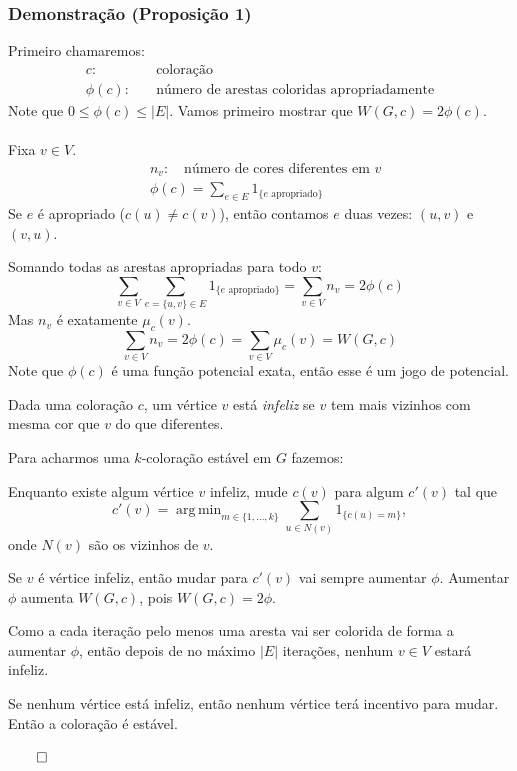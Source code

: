 \documentclass{beamer}
\DeclareMathOperator*{\argmin}{arg\,min}
\theoremstyle{plain}
\newcommand{\p}{\pause}
\begin{document}
\begin{frame}
  \frametitle{Demonstração (Proposição 1)}
  Primeiro chamaremos:
  \begin{align*}
    c:\quad &\text{coloração}\\
    \phi(c):\quad &\text{número de arestas coloridas apropriadamente}
  \end{align*}\p
  Note que $0\leq \phi(c)\leq |E|$. Vamos primeiro mostrar que $W(G,c)=2\phi(c)$.\\~\\\p
  Fixa $v\in V$.\p
  \begin{align*}
    &n_v:\quad \text{número de cores diferentes em $v$}\\
    &\phi(c)=\sum_{e\in E}1_{\{e\text{ apropriado}\}}
  \end{align*}\p
  Se $e$ é apropriado ($c(u)\neq c(v)$), então contamos $e$ duas vezes: $(u,v)$ e $(v,u)$.
\end{frame}

\begin{frame}
  Somando todas as arestas apropriadas para todo $v$:
  \begin{equation*}
    \sum_{v\in V}\sum_{e=\{u,v\}\in E}1_{\{e\text{ apropriado}\}}=\sum_{v\in V}n_v=2\phi(c)
  \end{equation*}\p
  Mas $n_v$ é exatamente $\mu_c(v)$.\p
  \begin{equation*}
    \sum_{v\in V}n_v=2\phi(c)=\sum_{v\in V}\mu_c(v)=W(G,c)
  \end{equation*}\p
  Note que $\phi(c)$ é uma função potencial exata, então esse é um jogo de potencial.
\end{frame}

\begin{frame}
  Dada uma coloração $c$, um vértice $v$ está \textit{infeliz} se $v$ tem mais vizinhos com mesma
  cor que $v$ do que diferentes.\p

  Para acharmos uma $k$-coloração estável em $G$ fazemos:

  Enquanto existe algum vértice $v$ infeliz, mude $c(v)$ para algum $c'(v)$ tal que
  \begin{equation*}
    c'(v)=\argmin_{m\in\{1,\ldots,k\}}\sum_{u\in N(v)}1_{\{c(u)=m\}},
  \end{equation*}
  onde $N(v)$ são os vizinhos de $v$.
\end{frame}

\begin{frame}
  Se $v$ é vértice infeliz, então mudar para $c'(v)$ vai sempre aumentar $\phi$. Aumentar $\phi$
  aumenta $W(G,c)$, pois $W(G,c)=2\phi$.

  Como a cada iteração pelo menos uma aresta vai ser colorida de forma a aumentar $\phi$, então
  depois de no máximo $|E|$ iterações, nenhum $v\in V$ estará infeliz.

  Se nenhum vértice está infeliz, então nenhum vértice terá incentivo para mudar. Então a coloração
  é estável.

  \hfill$\qed$
\end{frame}
\end{document}
